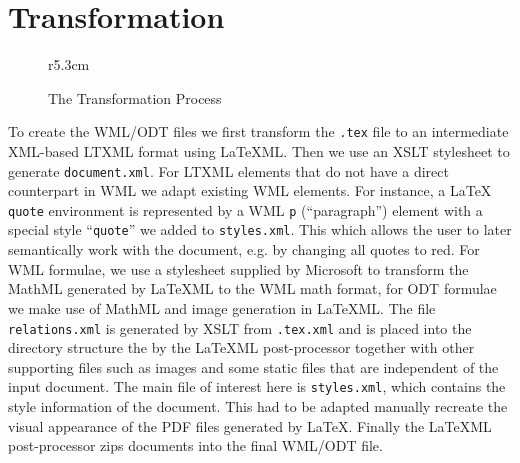 \documentclass{llncs}
\def\latexml{{\LaTeX}ML\xspace}
\begin{document}
\section{Transformation}\label{sec:trans}

\begin{figure}r{5.3cm}\scriptsize\vspace*{-3em}
\caption{The Transformation Process}\label{fig:arch}\vspace*{-1.5em}
\end{figure}
To create the WML/ODT files we first transform the \texttt{.tex} file to an intermediate
XML-based \textsf{LTXML} format using \latexml. Then we use an XSLT stylesheet to generate
\texttt{document.xml}. For \textsf{LTXML} elements that do not have a direct counterpart
in WML we adapt existing WML elements. For instance, a {\LaTeX} \texttt{quote} environment
is represented by a WML \texttt{p} (``paragraph'') element with a special style
``\texttt{quote}'' we added to \texttt{styles.xml}. This which allows the user to later
semantically work with the document, e.g. by changing all quotes to red.  For WML
formulae, we use a stylesheet supplied by Microsoft to transform the MathML generated by
\latexml to the WML math format, for ODT formulae we make use of MathML and image
generation in \latexml. The file \texttt{relations.xml} is generated by XSLT from
\texttt{.tex.xml} and is placed into the directory structure the by the \latexml
post-processor together with other supporting files such as images and some static files
that are independent of the input document. The main file of interest here is
\texttt{styles.xml}, which contains the style information of the document. This had to be
adapted manually recreate the visual appearance of the PDF files generated by
{\LaTeX}. Finally the \latexml post-processor zips documents into the final WML/ODT file.
\end{document}
